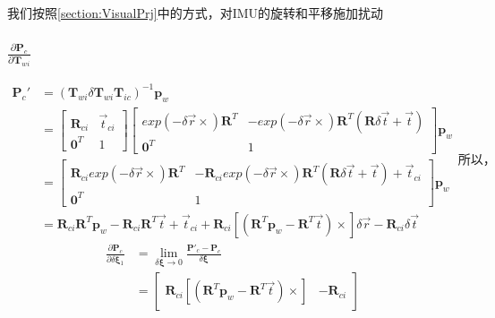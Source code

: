 \documentclass{article}
\begin{document}
我们按照\ref{section:VisualPrj}中的方式，对IMU的旋转和平移施加扰动
\subsubsection{$\frac{\partial{\boldsymbol{P}_c}}{\partial{\boldsymbol{T}_{wi}}}$}
$$
\begin{aligned}
	\boldsymbol{P}_c' & =(\boldsymbol{T}_{wi}\delta\boldsymbol{T}_{wi}\boldsymbol{T}_{ic})^{-1}\boldsymbol{p}_w \\ & = 
	\left[ 
	\begin{matrix} 
	\boldsymbol{R}_{ci}                                                & \vec{t}_{ci}                                                                   \\ 
	\boldsymbol{0}^T                                                   & 1                                                                              
	\end{matrix}
	\right]
	\left[
	\begin{matrix}
	exp(-\delta{\vec{r}}\times)\boldsymbol{R}^T                        & -exp(-\delta{\vec{r}}\times)\boldsymbol{R}^T(\boldsymbol{R}\delta\vec{t}+\vec{t})\\ 
	\boldsymbol{0}^T                                                   & 1                                                                              
	\end{matrix}
	\right] \boldsymbol{p}_w
	\\&=
	\left[
	\begin{matrix}
	\boldsymbol{R}_{ci}exp(-\delta{\vec{r}} \times) \boldsymbol{R}^T &                                                                                
	-\boldsymbol{R}_{ci}exp(-\delta{\vec{r}} \times) \boldsymbol{R}^T(\boldsymbol{R}\delta\vec{t}+\vec{t})+\vec{t}_{ci}\\
	\boldsymbol{0}^T                                                   & 1                                                                              
	\end{matrix}
	\right]\boldsymbol{p}_w \\& = 
	\boldsymbol{R}_{ci}\boldsymbol{R}^T\boldsymbol{p}_w-\boldsymbol{R}_{ci}\boldsymbol{R}^T\vec{t}+\vec{t}_{ci}+\boldsymbol{R}_{ci}[(\boldsymbol{R}^T\boldsymbol{p}_w-\boldsymbol{R}^T\vec{t})\times]\delta\vec{r}-\boldsymbol{R}_{ci}\delta\vec{t}
\end{aligned}
所以，
$$
\begin{equation}
	\begin{aligned}
		\frac{\partial\boldsymbol{P}_c}{\partial\delta\boldsymbol{\xi}_1}                     & =                    
		\lim_{\delta\boldsymbol{\xi}\rightarrow0} \frac{\boldsymbol{P}'_c-\boldsymbol{P}_c}{\delta\boldsymbol{\xi}}\\&=
		\left[
		\begin{matrix}
		\boldsymbol{R}_{ci}[(\boldsymbol{R}^T\boldsymbol{p}_w-\boldsymbol{R}^T\vec{t})\times] & -\boldsymbol{R}_{ci} 
		\end{matrix}
		\right]
	\end{aligned}
\end{equation} 
\end{document}
